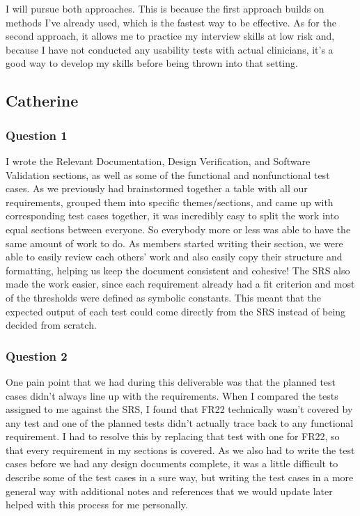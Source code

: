 \documentclass[12pt, titlepage]{article}
\renewcommand{\_}{\oldunderscore\allowbreak}
\begin{document}
I will pursue both approaches. 
This is because the first approach builds on methods I’ve already used, which is the fastest way to be effective. 
As for the second approach, it allows me to practice my interview skills at low risk and, because I have not conducted any usability tests with actual clinicians, it’s a good way to develop my skills before being thrown into that setting.

\subsection*{Catherine}
\subsubsection*{Question 1}
I wrote the Relevant Documentation, Design Verification, and Software Validation sections, as well as
some of the functional and nonfunctional test cases.
As we previously had brainstormed together a table with all our requirements, grouped them into specific
themes/sections, and came up with corresponding test cases together, it was incredibly easy to split
the work into equal sections between everyone. So everybody more or less was able to have the same
amount of work to do. As members started writing their section, we were able to easily review each others' work
and also easily copy their structure and formatting, helping us keep the document consistent and cohesive! 
The SRS also made the work easier, since each requirement already had a fit criterion and most of the thresholds 
were defined as symbolic constants. This meant that the expected output of each test could come directly from the 
SRS instead of being decided from scratch.

\subsubsection*{Question 2}
One pain point that we had during this deliverable was that the planned test cases 
didn't always line up with the requirements.
When I compared the tests assigned to me against the SRS, I found that FR22 technically wasn't covered by any test and
one of the planned tests didn't actually trace back to any functional requirement.
I had to resolve this by replacing that test with one for FR22, so that every requirement in my sections is covered.
As we also had to write the test cases before we had any design documents complete, it was 
a little difficult to describe some of the test cases in a sure way,
but writing the test cases in a more general way with additional notes and references that we would update later
helped with this process for me personally.
\end{document}
